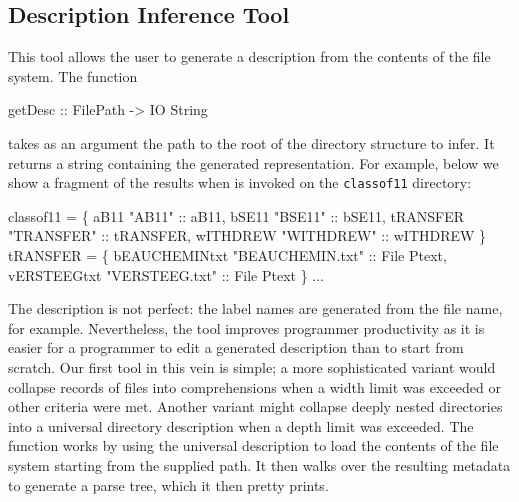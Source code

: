 \subsection{Description Inference Tool}
This tool allows the user to generate a \forest{} description from the
contents of the file system.   The function
\begin{code}
getDesc :: FilePath -> IO String
\end{code}
takes as an argument the path to the root of the directory structure
to infer.  It returns a string containing the generated
representation.  For example, below we show a fragment of the
results when
 is invoked on the \texttt{classof11} directory:
\begin{code}
 classof11 =  \{
    aB11  "AB11" :: aB11,
    bSE11  "BSE11" :: bSE11,
    tRANSFER  "TRANSFER" :: tRANSFER,
    wITHDREW  "WITHDREW" :: wITHDREW \}
 tRANSFER =  \{
    bEAUCHEMINtxt  "BEAUCHEMIN.txt" :: File Ptext,
    vERSTEEGtxt  "VERSTEEG.txt" :: File Ptext \}
...
\end{code}
The description is not perfect: the label names are generated 
from the file name, for example.  Nevertheless, the tool improves
programmer productivity as it is
easier for a programmer to edit a generated description than to
start from scratch.   Our first tool in this vein is simple;
a more sophisticated variant would collapse records of files
into comprehensions when a width limit was exceeded or
other criteria were met.  Another variant might
collapse deeply nested directories into a universal directory
description when a depth limit was exceeded.
The  function works by using the universal description to
load the contents of the file system starting from the supplied path.
It then walks over the resulting metadata to generate a \forest{}
parse tree, which it then pretty prints.



